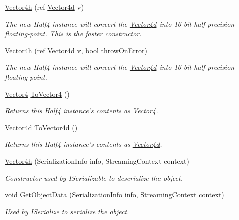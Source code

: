 \begin{DoxyCompactItemize}
\hyperlink{struct_open_t_k_1_1_vector4h_a91998b9f3955fc8df5063a8309593494}{Vector4h} (ref \hyperlink{struct_open_t_k_1_1_vector4d}{Vector4d} v)
\begin{DoxyCompactList}\small\item\em The new Half4 instance will convert the \hyperlink{struct_open_t_k_1_1_vector4d}{Vector4d} into 16-\/bit half-\/precision floating-\/point. This is the faster constructor. \end{DoxyCompactList}\item 
\hyperlink{struct_open_t_k_1_1_vector4h_a76ee6c9481341749277645053da84d57}{Vector4h} (ref \hyperlink{struct_open_t_k_1_1_vector4d}{Vector4d} v, bool throw\-On\-Error)
\begin{DoxyCompactList}\small\item\em The new Half4 instance will convert the \hyperlink{struct_open_t_k_1_1_vector4d}{Vector4d} into 16-\/bit half-\/precision floating-\/point. \end{DoxyCompactList}\item 
\hyperlink{struct_open_t_k_1_1_vector4}{Vector4} \hyperlink{struct_open_t_k_1_1_vector4h_a06a320d9b8486b2e290108726b5dae78}{To\-Vector4} ()
\begin{DoxyCompactList}\small\item\em Returns this Half4 instance's contents as \hyperlink{struct_open_t_k_1_1_vector4}{Vector4}. \end{DoxyCompactList}\item 
\hyperlink{struct_open_t_k_1_1_vector4d}{Vector4d} \hyperlink{struct_open_t_k_1_1_vector4h_a717f80de2397b3cfd51e828dbae62b10}{To\-Vector4d} ()
\begin{DoxyCompactList}\small\item\em Returns this Half4 instance's contents as \hyperlink{struct_open_t_k_1_1_vector4d}{Vector4d}. \end{DoxyCompactList}\item 
\hyperlink{struct_open_t_k_1_1_vector4h_abab632dd6b0d378f55bd6e76a1f0d2a5}{Vector4h} (Serialization\-Info info, Streaming\-Context context)
\begin{DoxyCompactList}\small\item\em Constructor used by I\-Serializable to deserialize the object.\end{DoxyCompactList}\item 
void \hyperlink{struct_open_t_k_1_1_vector4h_a96b470cc0a9b672a7bd056806658471a}{Get\-Object\-Data} (Serialization\-Info info, Streaming\-Context context)
\begin{DoxyCompactList}\small\item\em Used by I\-Serialize to serialize the object.\end{DoxyCompactList}\item 

\end{DoxyCompactItemize}
